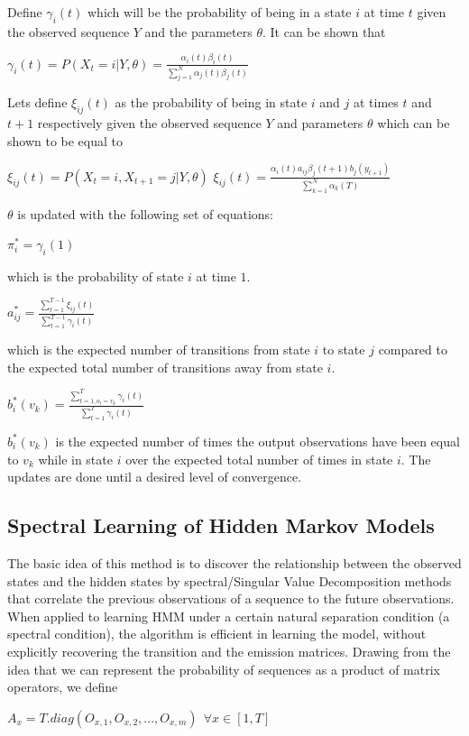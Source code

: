 \documentclass[letterpaper]{article}
\begin{document}
Define $\gamma_{i}(t)$ which will be the probability of being in a state $i$ at time $t$ given the observed sequence $Y$ and the parameters $\theta$. It can be shown that
\begin{center}
	$\gamma_{i}(t)=P(X_{t}=i|Y,\theta) = \frac{\alpha_{i}(t)\beta_{i}(t)}{\sum_{j=1}^N \alpha_{j}(t)\beta_{j}(t)}$
\end{center}
Lets define $\xi_{ij}(t)$ as the probability of being in state $i$ and $j$ at times $t$ and $t+1$ respectively given the observed sequence $Y$ and parameters $\theta$ which can be shown to be equal to

\begin{center}
	$\xi_{ij}(t)=P(X_{t}=i,X_{t+1}=j|Y,\theta)$
	$\xi_{ij}(t)=\frac{\alpha_{i}(t) a_{ij} \beta_{j}(t+1) b_{j}(y_{t+1})}{\sum_{k=1}^N \alpha_k(T)}$
\end{center}

$\theta$ is updated with the following set of equations:

\begin{center}
	$\pi_{i}^* = \gamma_{i}(1)$
\end{center}
which is the probability of state $i$ at time $1$.

\begin{center}
	$a_{ij}^*=\frac{\sum^{T-1}_{t=1}\xi_{ij}(t)}{\sum^{T-1}_{t=1}\gamma_{i}(t)}$
\end{center}
which is the expected number of transitions from state $i$ to state $j$ compared to the expected total number of transitions away from state $i$.

\begin{center}
	$b_{i}^*(v_{k})=\frac{\sum^T_{t=1,o_{t}=v_{k}} \gamma_{i}(t)}{\sum^T_{t=1} \gamma_i(t)}$
\end{center}

$b_{i}^*(v_{k})$ is the expected number of times the output observations have been equal to $v_{k}$ while in state $i$ over the expected total number of times in state $i$. The updates are done until a desired level of convergence.

\subsection{Spectral Learning of Hidden Markov Models}
The basic idea of this method is to discover the relationship between the observed states and the hidden states by spectral/Singular Value Decomposition methods that correlate the previous observations of a sequence to the future observations. When applied to learning HMM under a certain natural separation condition (a spectral condition), the algorithm is efficient in learning the model, without explicitly recovering the transition and the emission matrices.
Drawing from the idea that we can represent the probability of sequences as a product of matrix operators, we define
\begin{center}
	$A_{x} = T.diag(O_{x,1}, O_{x,2}, ... , O_{x,m} )\ \ \forall x \in [1, T]$
\end{center}
\end{document}
